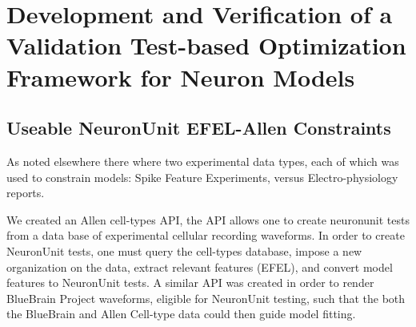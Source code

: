 \section{Development and Verification of a Validation Test-based Optimization Framework for Neuron Models}






\subsection{Useable NeuronUnit EFEL-Allen Constraints}

As noted elsewhere there where two experimental data types, each of which was used to constrain models: Spike Feature Experiments, versus Electro-physiology reports.

We created an Allen cell-types API, the API allows one to create neuronunit tests from a data base of experimental cellular recording waveforms. In order to create NeuronUnit tests, one must query the cell-types database, impose a new organization on the data, extract relevant features (EFEL), and convert model features to NeuronUnit tests. A similar API was created in order to render BlueBrain Project waveforms, eligible for NeuronUnit testing, such that the both the BlueBrain \cite{toledo} and Allen Cell-type data could then guide model fitting. %


